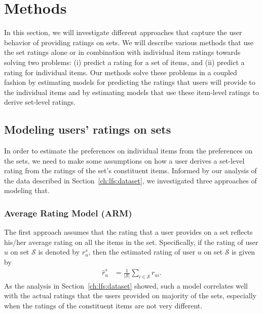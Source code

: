 \section{Methods} \label{ch:lfs:lfs_method}
In this section, we will investigate different approaches that capture the user behavior of providing ratings on sets. We will describe various methods that use the set ratings alone or in combination with individual item ratings towards solving two problems: (i) predict a rating for a set of items, and (ii) predict a rating for individual items.  
Our methods solve these problems in a coupled fashion by estimating models for predicting the ratings that users will provide to the individual items and by estimating models that use these item-level ratings to derive set-level ratings.



\iffalse
In this section, we describe various methods that use the set ratings alone
or in combination with individual item ratings towards solving two
problems: (i) predict a rating for a set of items, and (ii)
predict a rating for individual items. 
Our methods solve these problems in a coupled fashion by estimating
models for predicting the ratings that users will provide to the individual
items and by estimating models that use these item-level ratings to derive
set-level ratings.
\fi


\subsection{Modeling users' ratings on sets}
In order to estimate the preferences on individual items from the preferences on the sets, we need to make some assumptions on how a user derives a set-level
rating from the ratings of the set's constituent items.
Informed by our analysis of the data described in Section~\ref{ch:lfs:dataset}, we
investigated three approaches of modeling that.



\subsubsection*{Average Rating Model (ARM)}
The first approach assumes that the rating that a user provides
on a set reflects his/her average rating on all the items in the
set. Specifically, if the rating of user $u$ on set $\mathcal{S}$ is denoted by $r_{u}^s$,
then the estimated rating of user $u$ on set $\mathcal{S}$ is given by
\begin{equation} \label{avgSetEq}
  \begin{split}
    \hat{r}_{u}^s &= \frac{1}{|\mathcal{S}|} \sum_{i \in \mathcal{S}} r_{ui}.
  \end{split}
\end{equation}
\noindent As the analysis in Section~\ref{ch:lfs:dataset} showed, such a model correlates well
with the actual ratings that the users provided on majority of the sets,
especially when the ratings of the constituent items are not very different.


